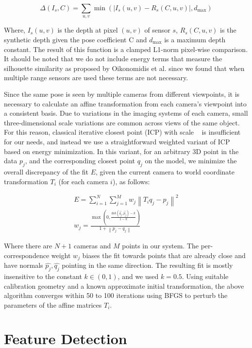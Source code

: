 \[
    \Delta\left(I_s,C\right)=\sum_{u,v}\operatorname{min}\left(\left|I_s(u,v)-R_s(C,u,v)\right|,d_{\text{max}}\right)
    \label{eq:pso_depth_compare}
\]

Where, $I_s(u,v)$ is the depth at pixel $(u,v)$ of sensor $s$, $R_s(C,u,v)$ is the synthetic depth given the pose coefficient C and $d_{\text{max}}$ is a maximum depth constant. The result of this function is a clamped L1-norm pixel-wise comparison. It should be noted that we do not include energy terms that measure the silhouette similarity as proposed by Oikonomidis et al. since we found that when multiple range sensors are used these terms are not necessary.

Since the same pose is seen by multiple cameras from different viewpoints, it is necessary to calculate an affine transformation from each camera's viewpoint into a consistent basis. Due to variations in the imaging systems of each camera, small three-dimensional scale variations are common across views of the same object. For this reason, classical iterative closest point (ICP) with scale ~\cite{Horn87closed-formsolution} is insufficient for our needs, and instead we use a straightforward weighted variant of ICP based on energy minimization. In this variant, for an arbitrary 3D point in the data $p_j$, and the corresponding closest point $q_j$ on the model, we minimize the overall discrepancy of the fit $E$, given the current camera to world coordinate transformation $T_i$ (for each camera $i$), as follows:

\begin{align}
E = \sum_{i=1}^N\sum_{j=1}^Mw_j\left\|T_iq_j - p_j\right\|^2 \nonumber \\
w_j = \frac{\operatorname{max}\left(0, \frac{\text{dot}(\hat{q_j}, \hat{p_j}) - k}{ 1 - k}\right)}{1 + \left\|p_j-q_j\right\|} \nonumber
\end{align}

Where there are $N+1$ cameras and $M$ points in our system. The per-correspondence weight $w_j$ biases the fit towards points that are already close and have normals $\hat{p_j},\hat{q_j}$ pointing in the same direction. The resulting fit is mostly insensitive to the constant $k \in (0,1)$, and we used $k = 0.5$. Using suitable calibration geometry and a known approximate initial transformation, the above algorithm converges within 50 to 100 iterations using BFGS to perturb the parameters of the affine matrices $T_i$.

\section{Feature Detection}
\label{sec:realtimefeaturedetection}

